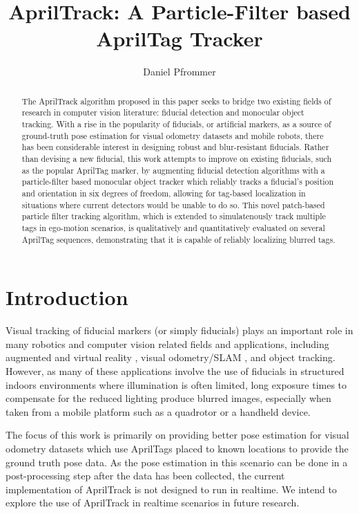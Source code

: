 \documentclass[letterpaper, 10 pt, conference]{ieeeconf}
\title{\textbf{AprilTrack: A Particle-Filter based AprilTag Tracker}}
\author{Daniel Pfrommer}
\date{}
\begin{document}
\maketitle

\begin{abstract}

	The AprilTrack algorithm proposed in this paper seeks to bridge two existing fields of research in computer vision literature: fiducial detection and monocular object tracking. With a rise in the popularity of fiducials, or artificial markers, as a source of ground-truth pose estimation for visual odometry datasets and mobile robots, there has been considerable interest in designing robust and blur-resistant fiducials. Rather than devising a new fiducial, this work attempts to improve on existing fiducials, such as the popular AprilTag marker, by augmenting fiducial detection algorithms with a particle-filter based monocular object tracker which reliably tracks a fiducial's position and orientation in six degrees of freedom, allowing for tag-based localization in situations where current detectors would be unable to do so. This novel patch-based particle filter tracking algorithm, which is extended to simulatenously track multiple tags in ego-motion scenarios, is qualitatively and quantitatively evaluated on several AprilTag sequences, demonstrating that it is capable of reliably localizing blurred tags.
	
\end{abstract}

\section{Introduction}


Visual tracking of fiducial markers (or simply fiducials) plays an important role in many robotics and computer vision related fields and applications, including augmented and virtual reality \cite{AugmentedReality}, visual odometry/SLAM \cite{TagSLAM}, and object tracking. However, as many of these applications involve the use of fiducials in structured indoors environments where illumination is often limited, long exposure times to compensate for the reduced lighting produce blurred images, especially when taken from a mobile platform such as a quadrotor or a handheld device.

The focus of this work is primarily on providing better pose estimation for visual odometry datasets which use AprilTags placed to known locations to provide the ground truth pose data. As the pose estimation in this scenario can be done in a post-processing step after the data has been collected, the current implementation of AprilTrack is not designed to run in realtime. We intend to explore the use of AprilTrack in realtime scenarios in future research.
\end{document}
